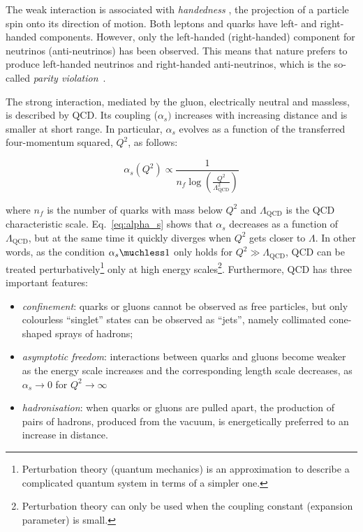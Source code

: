 			The weak interaction is associated with \textit{handedness} \ie, the projection of a particle spin onto its direction of motion. Both leptons and quarks have left- and right-handed components. However, only the left-handed (right-handed) component for neutrinos (anti-neutrinos) has been observed. This means that nature prefers to produce left-handed neutrinos and right-handed anti-neutrinos, which is the so-called \textit{parity violation}~\cite{Weinberg:1996kr}. 

			The strong interaction, mediated by the gluon, electrically neutral and massless, is described by \ac{QCD}. Its coupling ($\alpha_s)$ increases with increasing distance and is smaller at short range. In particular, $\alpha_s$ evolves as a function of the transferred four-momentum squared, $Q^2$, as follows: 

			\begin{equation}
				\label{eq:alpha_s}
				\alpha_s (Q^2) \propto \displaystyle \frac{1}{n_f \log (\frac{Q^2}{\Lambda_{\mathrm{QCD}}^2})} 
			\end{equation}

			\noindent where $n_f$ is the number of quarks with mass below $Q^2$ and $\Lambda_{\mathrm{QCD}}$ is the \ac{QCD} characteristic scale. Eq.~\ref{eq:alpha_s} shows that $\alpha_s$ decreases as a function of $\Lambda_{\mathrm{QCD}}$, but at the same time it quickly diverges when $Q^2$ gets closer to $\Lambda$. In other words, as the condition $\alpha_s \muchless 1$ only holds for $Q^2 \gg \Lambda_{\mathrm{QCD}}$, \ac{QCD} can be treated perturbatively\footnote{Perturbation theory (quantum mechanics) is an approximation to describe a complicated quantum system in terms of a simpler one.} only at high energy scales\footnote{Perturbation theory can only be used when the coupling constant (expansion parameter) is small.}. Furthermore, \ac{QCD} has three important features:

			\begin{itemize}
				\item \emph{confinement}: quarks or gluons cannot be observed as free particles, but only colourless “singlet” states can be observed as “jets”, namely collimated cone-shaped sprays of hadrons; 

				\item \emph{asymptotic freedom}: interactions between quarks and gluons become weaker as the energy scale increases and the corresponding length scale decreases, as $\alpha_s \to 0$ for $Q^2 \to \infty$~%

				\item \emph{hadronisation}: when quarks or gluons are pulled apart, the production of pairs of hadrons, produced from the vacuum, is energetically preferred to an increase in distance.
			\end{itemize}

